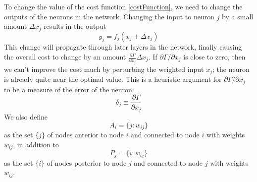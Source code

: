 \documentclass[twoside,english]{uiofysmaster}
\begin{document}
To change the value of the cost function \eqref{costFunction}, we need to change the outputs of the neurons in the network. 
Changing the input to neuron $j$ by a small amount $\Delta x_j$ results in the output
\begin{equation}
 y_j = f_j(x_j + \Delta x_j)
 \label{neuronError}
\end{equation}
This change will propagate through later layers in the network, finally causing the overall cost to change
by an amount $\frac{\partial \Gamma}{\partial x_j}\Delta x_j$. If $\partial \Gamma / \partial x_j$ is close to zero,
then we can't improve the cost much by perturbing the weighted input $x_j$; the neuron is already quite near the optimal value.
This is a heuristic argument for $\partial \Gamma / \partial x_j$ to be a measure of the error of the neuron:
\begin{equation}
 \delta_j \equiv \frac{\partial \Gamma}{\partial x_j}
\end{equation}
We also define
\begin{equation}
 A_i = \{j:w_{ij}\}
\end{equation}
as the set $\{j\}$ of nodes anterior to node $i$ and connected to node $i$ with weights $w_{ij}$, in addition to
\begin{equation}
 P_j = \{i:w_{ij}\}
\end{equation}
as the set $\{i\}$ of nodes posterior to node $j$ and connected to node $j$ with weights $w_{ij}$. 
\end{document}
